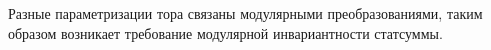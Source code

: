 Разные параметризации тора связаны модулярными преобразованиями, таким образом возникает требование
модулярной инвариантности статсуммы.

